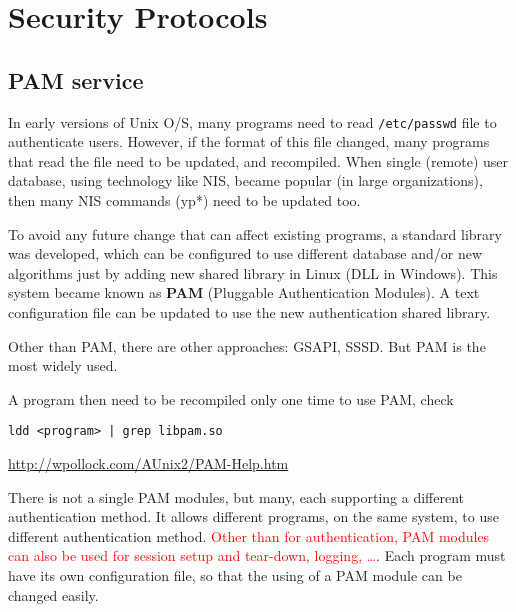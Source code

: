\chapter{Security Protocols}

\section{PAM service}
\label{sec:PAM}

In early versions of Unix O/S, many programs need to read \verb!/etc/passwd!
file to authenticate users. However, if the format of this file changed, many
programs that read the file need to be updated, and recompiled. When single
(remote) user database, using technology like NIS, became popular (in large
organizations), then many NIS commands (yp*) need to be updated too. 

To avoid any future change that can affect existing programs, a standard library
was developed, which can be configured to use different database and/or new
algorithms just by adding new shared library in Linux (DLL in Windows). This
system became known as {\bf PAM} (Pluggable Authentication Modules). A text
configuration file can be updated to use the new authentication shared library. 

\begin{mdframed}
Other than PAM, there are other approaches: GSAPI, SSSD. But PAM is the most
widely used.
\end{mdframed}

A program then need to be recompiled only one time to use PAM, check 
\begin{verbatim}
ldd <program> | grep libpam.so
\end{verbatim} 
\url{http://wpollock.com/AUnix2/PAM-Help.htm}

There is not a single PAM modules, but many, each supporting a different
authentication method. It allows different programs, on the same system, to use
different authentication method. \textcolor{red}{Other than for authentication,
PAM modules can also be used for session setup and tear-down, logging, \ldots}.
Each program must have its own configuration file, so that the using of a PAM
module can be changed easily.

